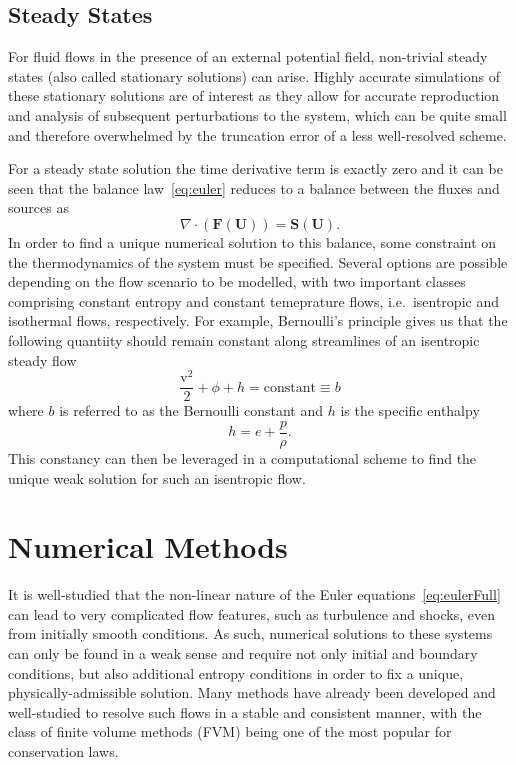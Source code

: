 \subsection{Steady States}

For fluid flows in the presence of an external potential field, non-trivial steady states (also called stationary solutions) can arise. Highly accurate simulations of these stationary solutions are of interest as they allow for accurate reproduction and analysis of subsequent perturbations to the system, which can be quite small and therefore overwhelmed by the truncation error of a less well-resolved scheme.

For a steady state solution the time derivative term is exactly zero and it can be seen that the balance law~\eqref{eq:euler} reduces to a balance between the fluxes and sources as
\begin{equation} \label{eq:balance}
\nabla\cdot(\mathbf{F}(\mathbf{U}))=\mathbf{S}(\mathbf{U}).
\end{equation}
In order to find a unique numerical solution to this balance, some constraint on the thermodynamics of the system must be specified. Several options are possible depending on the flow scenario to be modelled, with two important classes comprising constant entropy and constant temeprature flows, i.e.~isentropic and isothermal flows, respectively. For example, Bernoulli's principle gives us that the following quantiity should remain constant along streamlines of an isentropic steady flow
\begin{equation}
\frac{\mathrm{v}^2}{2}+\phi+h=\textrm{constant}\equiv b
\end{equation}
where $b$ is referred to as the Bernoulli constant and $h$ is the specific enthalpy
\begin{equation} \label{eq:enthalpy}
h=e+\frac{p}{\rho}.
\end{equation}
This constancy can then be leveraged in a computational scheme to find the unique weak solution for such an isentropic flow.


\section{Numerical Methods}
\label{sec:numerics}

It is well-studied that the non-linear nature of the Euler equations~\eqref{eq:eulerFull} can lead to very complicated flow features, such as turbulence and shocks, even from initially smooth conditions. As such, numerical solutions to these systems can only be found in a weak sense and require not only initial and boundary conditions, but also additional entropy conditions in order to fix a unique, physically-admissible solution. Many methods have already been developed and well-studied to resolve such flows in a stable and consistent manner, with the class of finite volume methods (FVM) being one of the most popular for conservation laws.

